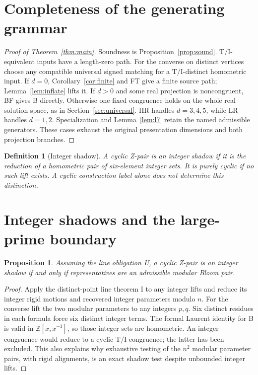 \documentclass[11pt]{article}
\newtheorem{proposition}[theorem]{Proposition}
\newtheorem{definition}[theorem]{Definition}
\theoremstyle{remark}
\newcommand{\Z}{\mathbb Z}
\newcommand{\TI}{\mathrm{T/I}}
\begin{document}
\section{Completeness of the generating grammar}
\begin{proof}[Proof of Theorem~\ref{thm:main}]
Soundness is Proposition~\ref{prop:sound}. $\TI$-equivalent inputs have
a length-zero path. For the converse on distinct vertices choose any
compatible universal signed matching for a $\TI$-distinct homometric input.
If $d=0$, Corollary~\ref{cor:finite} and FT give a finite source path;
Lemma~\ref{lem:inflate} lifts it. If $d>0$ and some real projection is
noncongruent, BF gives B directly. Otherwise one fixed congruence holds
on the whole real solution space, as in Section~\ref{sec:universal}.
HR handles $d=3,4,5$, while LR handles $d=1,2$. Specialization and
Lemma~\ref{lem:l7} retain the named admissible generators. These cases
exhaust the original presentation dimensions and both projection branches.
\end{proof}

\begin{definition}[Integer shadow]
A cyclic Z-pair is an integer shadow if it is the reduction of a
homometric pair of six-element integer sets. It is purely cyclic if
no such lift exists. A cyclic construction label alone does not determine
this distinction.
\end{definition}

\section{Integer shadows and the large-prime boundary}\label{sec:shadowfull}

\begin{proposition}\label{prop:shadowexact}
Assuming the line obligation U, a cyclic Z-pair is an integer shadow
if and only if representatives are an admissible modular Bloom pair.
\end{proposition}
\begin{proof}
Apply the distinct-point line theorem I to any integer lifts and reduce
its integer rigid motions and recovered integer parameters modulo $n$.
For the converse lift the two modular parameters to any integers $p,q$.
Six distinct residues in each formula force six distinct integer terms.
The formal Laurent identity for B is valid in $\Z[x,x^{-1}]$, so those
integer sets are homometric. An integer congruence would reduce to a
cyclic $\TI$ congruence; the latter has been excluded. This also explains
why exhaustive testing of the $n^2$ modular parameter pairs, with rigid
alignments, is an exact shadow test despite unbounded integer lifts.
\end{proof}
\end{document}
